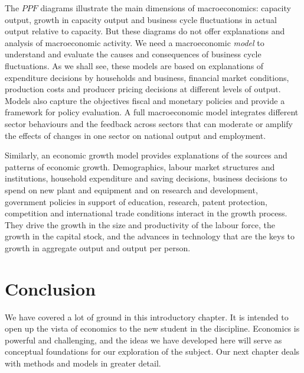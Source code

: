 The $PPF$ diagrams illustrate the main dimensions of macroeconomics: capacity output, growth in capacity output and business cycle fluctuations in actual output relative to capacity. But these diagrams do not offer explanations and analysis of macroeconomic activity. We need a macroeconomic \textit{model} to understand and evaluate the causes and consequences of business cycle fluctuations. As we shall see, these models are based on explanations of expenditure decisions by households and business, financial market conditions, production costs and producer pricing decisions at different levels of output. Models also capture the objectives fiscal and monetary policies and provide a framework for policy evaluation.  A full macroeconomic model integrates different sector behaviours and the feedback across sectors that can moderate or amplify the effects of changes in one sector on national output and employment. 

Similarly, an economic growth model provides explanations of the sources and patterns of economic growth. Demographics, labour market structures and institutions, household expenditure and saving decisions, business decisions to spend on new plant and equipment and on research and development,  government policies in support of education, research, patent protection, competition and international trade conditions interact in the growth process. They drive the growth in the size and productivity of the labour force, the growth in the capital stock, and the advances in technology that are the keys to growth in aggregate output and output per person.

\section*{Conclusion}

We have covered a lot of ground in this introductory chapter. It is intended to open up the vista of economics to the new student in the discipline. Economics is powerful and challenging, and the ideas we have developed here will serve as conceptual foundations for our exploration of the subject. Our next chapter deals with methods and models in greater detail.